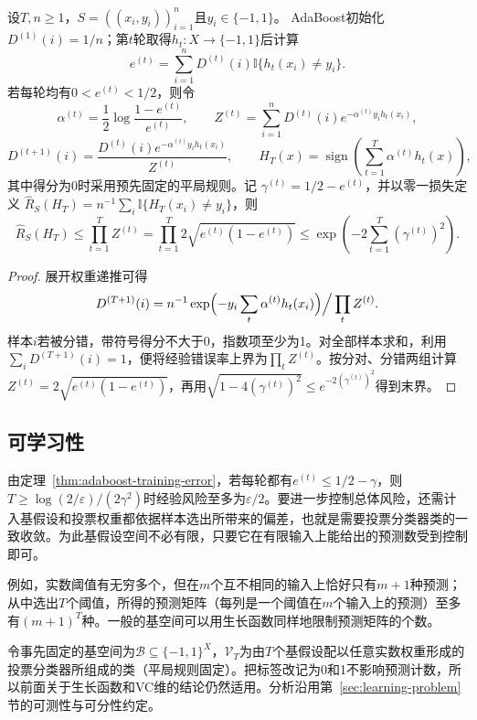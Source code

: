 \begin{theorem}[AdaBoost经验风险界]
\label{thm:adaboost-training-error}
设$T,n\geq1$，$S=((x_i,y_i))_{i=1}^n$且$y_i\in\{-1,1\}$。
AdaBoost初始化$D^{(1)}(i)=1/n$；第$t$轮取得$h_t:X\to\{-1,1\}$后计算
\[
 e^{(t)}=\sum_{i=1}^nD^{(t)}(i)\mathbb I\{h_t(x_i)\neq y_i\}.
\]
若每轮均有$0<e^{(t)}<1/2$，则令
\[
 \alpha^{(t)}=\frac12\log\frac{1-e^{(t)}}{e^{(t)}},\qquad
 Z^{(t)}=\sum_{i=1}^nD^{(t)}(i)e^{-\alpha^{(t)}y_i h_t(x_i)},
\]
\[
 D^{(t+1)}(i)
 =\frac{D^{(t)}(i)e^{-\alpha^{(t)}y_i h_t(x_i)}}{Z^{(t)}},
 \qquad
 H_T(x)=\operatorname{sign}\!\left(\sum_{t=1}^T\alpha^{(t)}h_t(x)\right),
\]
其中得分为0时采用预先固定的平局规则。记
$\gamma^{(t)}=1/2-e^{(t)}$，并以零一损失定义
$\hat R_S(H_T)=n^{-1}\sum_i\mathbb I\{H_T(x_i)\neq y_i\}$，则
\begin{equation}
 \hat R_S(H_T)\leq\prod_{t=1}^T Z^{(t)}
 =\prod_{t=1}^T2\sqrt{e^{(t)}(1-e^{(t)})}
 \leq\exp\left(-2\sum_{t=1}^T(\gamma^{(t)})^2\right).
 \label{eq:adaboost-training-bound}
\end{equation}
\end{theorem}

\begin{proof}
展开权重递推可得
\[
D^{(T+1)}(i)=n^{-1}\exp\Bigl(-y_i\sum_t\alpha^{(t)}h_t(x_i)\Bigr)\Big/\prod_tZ^{(t)}.
\]
样本$i$若被分错，带符号得分不大于0，指数项至少为1。对全部样本求和，利用$\sum_iD^{(T+1)}(i)=1$，便将经验错误率上界为$\prod_tZ^{(t)}$。按分对、分错两组计算$Z^{(t)}=2\sqrt{e^{(t)}(1-e^{(t)})}$，再用$\sqrt{1-4(\gamma^{(t)})^2}\leq e^{-2(\gamma^{(t)})^2}$得到末界。
\end{proof}

\subsection{可学习性}

由定理~\ref{thm:adaboost-training-error}，若每轮都有$e^{(t)}\leq1/2-\gamma$，则$T\geq\log(2/\varepsilon)/(2\gamma^2)$时经验风险至多为$\varepsilon/2$。要进一步控制总体风险，还需计入基假设和投票权重都依据样本选出所带来的偏差，也就是需要投票分类器类的一致收敛。为此基假设空间不必有限，只要它在有限输入上能给出的预测数受到控制即可。

例如，实数阈值有无穷多个，但在$m$个互不相同的输入上恰好只有$m+1$种预测；从中选出$T$个阈值，所得的预测矩阵（每列是一个阈值在$m$个输入上的预测）至多有$(m+1)^T$种。一般的基空间可以用生长函数同样地限制预测矩阵的个数。

令事先固定的基空间为$\mathcal B\subseteq\{-1,1\}^X$，$\mathcal V_T$为由$T$个基假设配以任意实数权重形成的投票分类器所组成的类（平局规则固定）。把标签改记为0和1不影响预测计数，所以前面关于生长函数和VC维的结论仍然适用。分析沿用第~\ref{sec:learning-problem}节的可测性与可分性约定。

